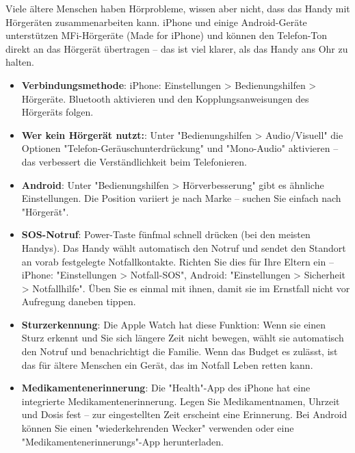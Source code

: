 
Viele ältere Menschen haben Hörprobleme, wissen aber nicht, dass das Handy mit Hörgeräten zusammenarbeiten kann. iPhone und einige Android-Geräte unterstützen MFi-Hörgeräte (Made for iPhone) und können den Telefon-Ton direkt an das Hörgerät übertragen – das ist viel klarer, als das Handy ans Ohr zu halten.

\begin{itemize}
  \item \textbf{Verbindungsmethode}: iPhone: Einstellungen > Bedienungshilfen > Hörgeräte. Bluetooth aktivieren und den Kopplungsanweisungen des Hörgeräts folgen.
  \item \textbf{Wer kein Hörgerät nutzt:}: Unter "Bedienungshilfen > Audio/Visuell" die Optionen "Telefon-Geräuschunterdrückung" und "Mono-Audio" aktivieren – das verbessert die Verständlichkeit beim Telefonieren.
  \item \textbf{Android}: Unter "Bedienungshilfen > Hörverbesserung" gibt es ähnliche Einstellungen. Die Position variiert je nach Marke – suchen Sie einfach nach "Hörgerät".
\end{itemize}


\begin{itemize}
  \item \textbf{SOS-Notruf}: Power-Taste fünfmal schnell drücken (bei den meisten Handys). Das Handy wählt automatisch den Notruf und sendet den Standort an vorab festgelegte Notfallkontakte. Richten Sie dies für Ihre Eltern ein – iPhone: "Einstellungen > Notfall-SOS", Android: "Einstellungen > Sicherheit > Notfallhilfe". Üben Sie es einmal mit ihnen, damit sie im Ernstfall nicht vor Aufregung daneben tippen.
  \item \textbf{Sturzerkennung}: Die Apple Watch hat diese Funktion: Wenn sie einen Sturz erkennt und Sie sich längere Zeit nicht bewegen, wählt sie automatisch den Notruf und benachrichtigt die Familie. Wenn das Budget es zulässt, ist das für ältere Menschen ein Gerät, das im Notfall Leben retten kann.
  \item \textbf{Medikamentenerinnerung}: Die "Health"-App des iPhone hat eine integrierte Medikamentenerinnerung. Legen Sie Medikamentnamen, Uhrzeit und Dosis fest – zur eingestellten Zeit erscheint eine Erinnerung. Bei Android können Sie einen "wiederkehrenden Wecker" verwenden oder eine "Medikamentenerinnerungs"-App herunterladen.
\end{itemize}

